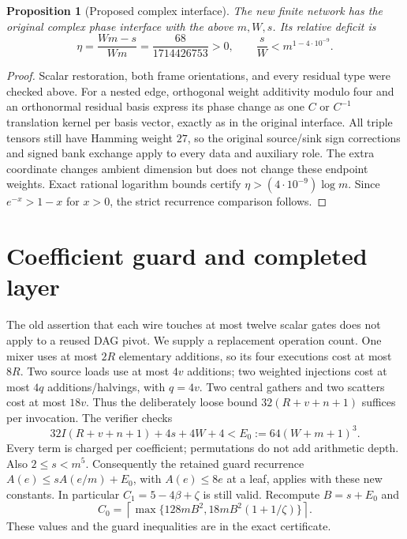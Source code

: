 \documentclass[11pt]{article}
\newtheorem{proposition}{Proposition}
\begin{document}
\begin{proposition}[Proposed complex interface]
The new finite network has the original complex phase interface with the
above $m,W,s$. Its relative deficit is
\[
 \eta=\frac{Wm-s}{Wm}=\frac{68}{1714426753}>0,
 \qquad \frac{s}{W}<m^{1-4\cdot10^{-9}}.
\]
\end{proposition}
\begin{proof}
Scalar restoration, both frame orientations, and every residual type were
checked above. For a nested edge, orthogonal weight additivity modulo four
and an orthonormal residual basis express its phase change as one $C$ or
$C^{-1}$ translation kernel per basis vector, exactly as in the original
interface. All triple tensors still have Hamming weight $27$, so the original
source/sink sign corrections and signed bank exchange apply to every data
and auxiliary role. The extra coordinate changes ambient dimension but
does not change these endpoint weights. Exact rational logarithm bounds
certify $\eta>(4\cdot10^{-9})\log m$. Since $e^{-x}>1-x$ for $x>0$,
the strict recurrence comparison follows.
\end{proof}

\section{Coefficient guard and completed layer}
The old assertion that each wire touches at most twelve scalar gates does
not apply to a reused DAG pivot. We supply a replacement operation count.
One mixer uses at most $2R$ elementary additions, so its four executions
cost at most $8R$. Two source loads use at most $4v$ additions; two weighted
injections cost at most $4q$ additions/halvings, with $q=4v$. Two central
gathers and two scatters cost at most $18v$. Thus the deliberately loose
bound $32(R+v+n+1)$ suffices per invocation. The verifier checks
\[
 32I(R+v+n+1)+4s+4W+4 < E_0:=64(W+m+1)^3.
\]
Every term is charged per coefficient; permutations do not add arithmetic
depth. Also $2\le s<m^5$. Consequently the retained guard recurrence
$A(e)\le sA(e/m)+E_0$, with $A(e)\le8e$ at a leaf, applies with these new
constants. In particular $C_1=5-4\beta+\zeta$ is still valid. Recompute
$B=s+E_0$ and
\[
 C_0=\left\lceil\max\{128mB^2,18mB^2(1+1/\zeta)\}\right\rceil.
\]
These values and the guard inequalities are in the exact certificate.
\end{document}
